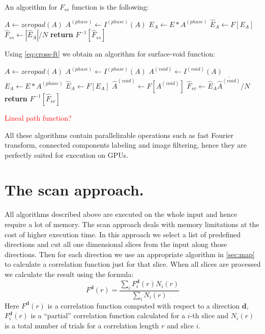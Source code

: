 \documentclass[reprint,amsmath,amssymb,aps,pre,showkeys,showpacs,nofootinbib]{revtex4-1}
\begin{document}
An algorithm for $F_{ss}$ function is the following:
\begin{algorithmic}[1]
    \State $A \gets zeropad(A)$
  \EndIf
  \State $A^{(phase)} \gets I^{(phase)} (A)$
  \State $E_A \gets E * A^{(phase)}$
  \State $\hat{E}_A \gets F[E_A]$
  \State $\hat{F}_{ss} \gets |\hat{E}_A| / N$
  \State \textbf{return} $F^{-1} [\hat{F}_{ss}]$
  \EndProcedure
\end{algorithmic}

Using \cref{eq:cross-ft} we obtain an algorithm for surface-void function:
\begin{algorithmic}[1]
    \State $A \gets zeropad(A)$
  \EndIf
  \State $A^{(phase)} \gets I^{(phase)} (A)$
  \State $A^{(void)} \gets I^{(void)} (A)$
  \State $E_A \gets E * A^{(phase)}$
  \State $\hat{E}_A \gets F[E_A]$
  \State $\hat{A}^{(void)} \gets F[A^{(void)}]$
  \State $\hat{F}_{sv} \gets \hat{E}_A \overline{\hat{A}^{(void)}} / N$
  \State \textbf{return} $F^{-1} [\hat{F}_{sv}]$
  \EndProcedure
\end{algorithmic}

\textcolor{red}{Lineal path function?}

All these algorithms contain parallelizable operations such as fast Fourier
transform, connected components labeling and image filtering, hence they are
perfectly suited for execution on GPUs.

\section{The scan approach.}
\label{sec:scan}
All algorithms described above are executed on the whole input and hence require
a lot of memory. The scan approach deals with memory limitations at the cost of
higher execution time. In this approach we select a list of predefined
directions and cut all one dimensional slices from the input along those
directions. Then for each direction we use an appropriate algorithm in
\cref{sec:map} to calculate a correlation function just for that slice. When all
slices are processed we calculate the result using the formula:
\begin{equation*}
  F^{\bm{d}}(r) = \frac{\sum\limits_i F^{\bm{d}}_i(r) N_i(r)}{\sum\limits_i N_i(r)}
\end{equation*}
Here $F^{\bm{d}}(r)$ is a correlation function computed with respect to a
direction $\bm{d}$, $F^{\bm{d}}_i(r)$ is a ``partial'' correlation
function calculated for a $i$-th slice and $N_i(r)$ is a total number of trials
for a correlation length $r$ and slice $i$.
\end{document}
